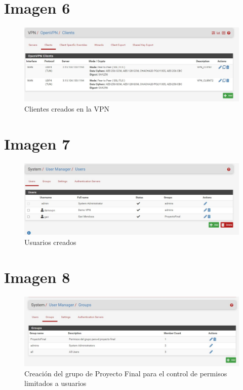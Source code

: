 \documentclass[12pt,letterspaper]{report}
\begin{document}
\chapter*{Imagen 6}
\vspace {0.3cm}
\begin{figure}[htb]
\centering
\includegraphics[scale=0.5]{Img6.jpg}
\caption{{Clientes creados en la VPN}}
\end{figure}\par
\vspace {0.1cm}


\chapter*{Imagen 7}
\vspace {0.3cm}
\begin{figure}[htb]
\centering
\includegraphics[scale=0.5]{Img7.jpg}
\caption{{Usuarios creados}}
\end{figure}\par
\vspace {0.1cm}

\chapter*{Imagen 8}
\vspace {0.3cm}
\begin{figure}[htb]
\centering
\includegraphics[scale=0.5]{Img8.jpg}
\caption{{Creación del grupo de Proyecto Final para el control de permisos limitados a usuarios}}
\end{figure}\par
\vspace {0.1cm}
\end{document}
